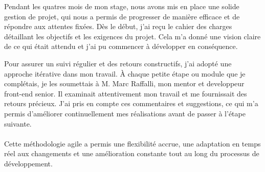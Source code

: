 Pendant les quatres mois de mon stage, nous avons mis en place une solide gestion de projet, qui nous a permis de progresser de manière efficace et de répondre aux attentes fixées. Dès le début, j’ai reçu le cahier des charges détaillant les objectifs et les exigences du projet. Cela m’a donné une vision claire de ce qui était attendu et j’ai pu commencer à développer en conséquence.

Pour assurer un suivi régulier et des retours constructifs, j’ai adopté une approche itérative dans mon travail. À chaque petite étape ou module que je complétais, je les soumettais à M. Marc Raffalli, mon mentor et developpeur front-end senior. Il examinait attentivement mon travail et me fournissait des retours précieux. J’ai pris en compte ces commentaires et suggestions, ce qui m’a permis d’améliorer continuellement mes réalisations avant de passer à l’étape suivante.
\\ \\
Cette méthodologie agile a permis une flexibilité accrue, une adaptation en temps réel aux changements et une amélioration constante tout au long du processus de développement.
